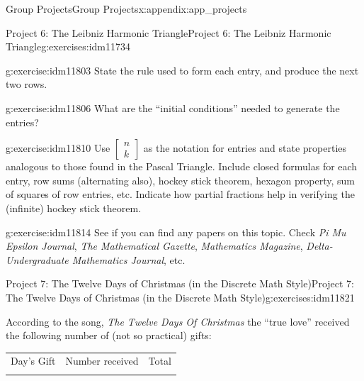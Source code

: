 \documentclass[oneside,10pt,]{book}
\numberwithin{equation}{chapter}
\newcommand{\hrulemedium}{\noalign{\hrule height 0.07em}}
\begin{document}
\begin{appendixptx}{Group Projects}{}{Group Projects}{}{}{x:appendix:app_projects}
\begin{exercises-section-numberless}{Project 6: The Leibniz Harmonic Triangle}{}{Project 6: The Leibniz Harmonic Triangle}{}{}{g:exercises:idm11734}
\begin{sidebyside}{1}{0}{0}{0}
\begin{sbspanel}{1}
{\par}
\end{sbspanel}%
\end{sidebyside}%
\begin{divisionexercise}{1}{}{}{g:exercise:idm11803}%
State the rule used to form each entry, and produce the next two rows.%
\end{divisionexercise}%
\begin{divisionexercise}{2}{}{}{g:exercise:idm11806}%
What are the ``initial conditions'' needed to generate the entries?%
\end{divisionexercise}%
\begin{divisionexercise}{3}{}{}{g:exercise:idm11810}%
Use \(\begin{bmatrix} n\\ k \end{bmatrix}\) as the notation for entries and state properties analogous to those found in the Pascal Triangle. Include closed formulas for each entry, row sums (alternating also), hockey stick theorem, hexagon property, sum of squares of row entries, etc. Indicate how partial fractions help in verifying the (infinite) hockey stick theorem.%
\end{divisionexercise}%
\begin{divisionexercise}{4}{}{}{g:exercise:idm11814}%
See if you can find any papers on this topic. Check \emph{Pi Mu Epsilon Journal}, \emph{The Mathematical Gazette}, \emph{Mathematics Magazine}, \emph{Delta-Undergraduate Mathematics Journal}, etc.%
\end{divisionexercise}%
\end{exercises-section-numberless}
%
%
\typeout{************************************************}
\typeout{************************************************}
%
\begin{exercises-section-numberless}{Project 7: The Twelve Days of Christmas (in the Discrete Math Style)}{}{Project 7: The Twelve Days of Christmas (in the Discrete Math Style)}{}{}{g:exercises:idm11821}
\begin{introduction}{}%
According to the song, \emph{The Twelve Days Of Christmas} the ``true love'' received the following number of (not so practical) gifts:%
\begin{sidebyside}{1}{0.2}{0.2}{0}%
\begin{sbspanel}{0.6}%
{\centering%
\begin{tabular}{lll}
Day's Gift&Number received&Total\tabularnewline\hrulemedium

\end{tabular}}
\end{sbspanel}
\end{sidebyside}
\end{introduction}
\end{exercises-section-numberless}
\end{appendixptx}
\end{document}
